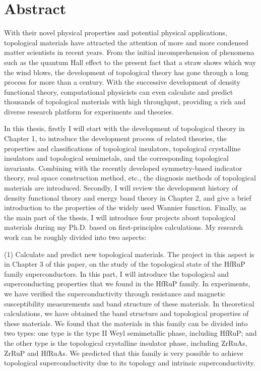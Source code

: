 \documentclass[twoside]{Style/ucasthesis}
\begin{document}
\intobmk\chapter*{Abstract}%

With their novel physical properties and potential physical applications, topological materials have attracted the attention of more and more   condensed matter scientists in recent years. From the initial incomprehension of phenomena such as the quantum Hall effect to the present fact that a straw shows which way the wind blows, the development of topological theory has gone through a long process for more than a century. 
With the successive development of density functional theory, computational physicists can even calculate and predict thousands of topological materials with high throughput, providing a rich and diverse research platform for experiments and theories.

In this thesis, firstly I will start with the development of topological theory in Chapter 1, to introduce the development process of related theories, the properties and classifications of topological insulators, topological crystalline insulators and topological semimetals, and the corresponding topological invariants. Combining with the recently developed symmetry-based indicator theory, real space construction method, etc., the diagnosis methods of topological materials are introduced. Secondly, I will review the development history of density functional theory and energy band theory in Chapter 2, and give a brief introduction to the properties of the widely used Wannier function.  
Finally, as the main part of the thesis, I will introduce four projects about topological materials during my Ph.D. based on first-principles calculations.
My research work can be roughly divided into two aspects:

(1) Calculate and predict new topological materials. The project in this aspect is in Chapter 3 of this paper, on the study of the topological state of the HfRuP family superconductors. In this part, I will introduce the topological and superconducting properties that we found in the HfRuP family. In experiments, we have verified the superconductivity through resistance and magnetic susceptibility measurements and band structure of these materials. In theoretical calculations, we have obtained the band structure and topological properties of these materials. We found that the materials in this family can be divided into two types: one type is the type II Weyl semimetallic phase, including HfRuP; and the other type is the topological crystalline insulator phase, including ZrRuAs, ZrRuP and HfRuAs. We predicted that this family is very possible to achieve topological superconductivity due to its topology and intrinsic superconductivity.
\end{document}
